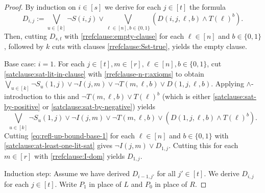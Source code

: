 \begin{proof}
By induction on $i \in [s]$ we derive for each $j \in [t]$ the formula
\begin{equation}
 D_{i,j} := \bigvee_{u \in [k]}\neg S(i,j) \lor \bigvee_{\ell \in [n], b \in \{0,1\}} \left( D(i,j,\ell,b) \land T(\ell)^b \right).
\end{equation}
Then, cutting $D_{s,t}$ with \eqref{rrefclause:empty-clause} for each $\ell \in [n]$ and $b \in \{0,1\}$, followed by $k$ cuts with clauses \eqref{rrefclause:Sst-true}, yields the empty clause.

Base case: $i=1$. For each $j \in [t], m \in [r], \ell \in [n], b \in \{0,1\}$, cut \eqref{satclause:sat-lit-in-clause} with \eqref{rrefclause-n-r:axioms} to obtain $\bigvee_{u \in [k]} \neg S_u(1,j) \lor \neg I(j,m) \lor \neg T(m,\ell,b) \lor D(1,j,\ell,b)$. Applying $\land$-introduction to this and $\neg T(m,\ell,b) \lor T(\ell)^b$ (which is either
\eqref{satclause:sat-by-positive} or \eqref{satclause:sat-by-negative}) yields 
\begin{equation}
\label{eq:refl-up-bound-base-1}
\bigvee_{u \in [k]} \neg S_u(1,j) \lor \neg I(j,m) \lor \neg T(m,\ell,b) \lor \left(D(1,j,\ell,b) \land T(\ell)^b \right). 
\end{equation}
Cutting \eqref{eq:refl-up-bound-base-1} for each $\ell \in [n]$ and $b \in \{0,1\}$ with \eqref{satclause:at-least-one-lit-sat} gives $\neg I(j,m) \lor D_{1,j}$. Cutting this for each $m \in [r]$ with \eqref{rrefclause:I-dom} yields $D_{1,j}$.

Induction step: Assume we have derived $D_{i-1,j'}$ for all $j' \in [t]$. We derive $D_{i,j}$ for each $j \in [t]$. Write $P_1$ in place of $L$ and  $P_0$ in place of $R$. 


\end{proof}
